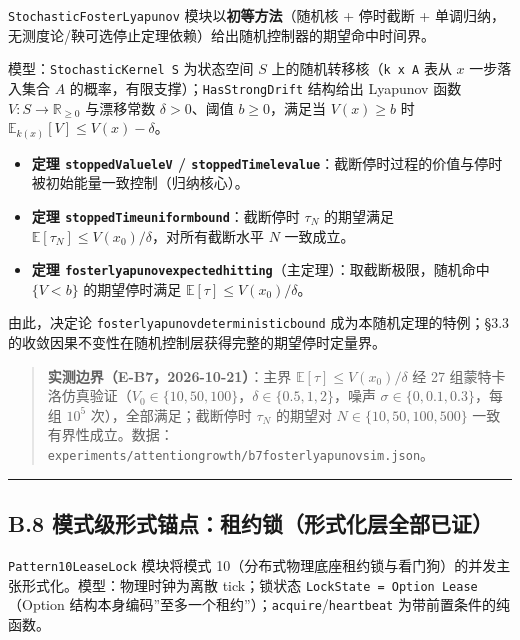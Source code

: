 \documentclass[
]{ctexart}
\providecommand{\tightlist}{%
  \setlength{\itemsep}{0pt}\setlength{\parskip}{0pt}}
\renewcommand{\_}{\discretionary{}{}{\textunderscore}}
\begin{document}
\texttt{StochasticFosterLyapunov} 模块以\textbf{初等方法}（随机核 +
停时截断 +
单调归纳，无测度论/鞅可选停止定理依赖）给出随机控制器的期望命中时间界。

模型：\texttt{StochasticKernel\ S} 为状态空间 \(S\)
上的随机转移核（\texttt{k\ x\ A} 表从 \(x\) 一步落入集合 \(A\)
的概率，有限支撑）；\texttt{HasStrongDrift} 结构给出 Lyapunov 函数
\(V:S\to\mathbb{R}_{\ge0}\) 与漂移常数 \(\delta>0\)、阈值
\(b\ge0\)，满足当 \(V(x)\ge b\) 时
\(\mathbb{E}_{k(x)}[V] \le V(x)-\delta\)。

\begin{itemize}
\tightlist
\item
  \textbf{定理 \texttt{stoppedValue\_le\_V} /
  \texttt{stoppedTime\_le\_value}}：截断停时过程的价值与停时被初始能量一致控制（归纳核心）。
\item
  \textbf{定理 \texttt{stoppedTime\_uniform\_bound}}：截断停时
  \(\tau_N\) 的期望满足
  \(\mathbb{E}[\tau_N] \le V(x_0)/\delta\)，对所有截断水平 \(N\)
  一致成立。
\item
  \textbf{定理
  \texttt{foster\_lyapunov\_expected\_hitting}}（主定理）：取截断极限，随机命中
  \(\{V<b\}\) 的期望停时满足 \(\mathbb{E}[\tau] \le V(x_0)/\delta\)。
\end{itemize}

由此，决定论 \texttt{foster\_lyapunov\_deterministic\_bound}
成为本随机定理的特例；§3.3
的收敛因果不变性在随机控制层获得完整的期望停时定量界。

\begin{quote}
\textbf{实测边界（E-B7，2026-10-21）}：主界
\(\mathbb{E}[\tau] \le V(x_0)/\delta\) 经 27
组蒙特卡洛仿真验证（\(V_0 \in \{10,50,100\}\)，\(\delta \in \{0.5,1,2\}\)，噪声
\(\sigma \in \{0,0.1,0.3\}\)，每组 \(10^5\) 次），全部满足；截断停时
\(\tau_N\) 的期望对 \(N \in \{10,50,100,500\}\)
一致有界性成立。数据：\texttt{experiments/attention\_growth/b7\_foster\_lyapunov\_sim.json}。
\end{quote}

\begin{center}\rule{0.5\linewidth}{0.5pt}\end{center}

\subsection{B.8
模式级形式锚点：租约锁（形式化层全部已证）}\label{b.8-ux6a21ux5f0fux7ea7ux5f62ux5f0fux951aux70b9ux79dfux7ea6ux9501ux5f62ux5f0fux5316ux5c42ux5168ux90e8ux5df2ux8bc1}

\texttt{Pattern10\_LeaseLock} 模块将模式
10（分布式物理底座租约锁与看门狗）的并发主张形式化。模型：物理时钟为离散
tick；锁状态 \texttt{LockState\ =\ Option\ Lease}（Option
结构本身编码''至多一个租约''）；\texttt{acquire}/\texttt{heartbeat}
为带前置条件的纯函数。
\end{document}
